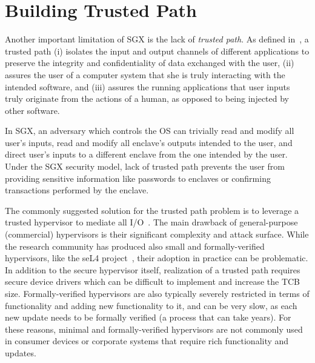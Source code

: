 
\section{Building Trusted Path}
\label{sec:secureInput}


Another important limitation of SGX is the lack of \emph{trusted path}. As defined in~\cite{filyanov2011uni}, a trusted path (i) isolates the input and output channels of different applications to preserve the integrity and confidentiality of data exchanged with the user, (ii) assures the user of a computer system that she is truly interacting with the intended software, and (iii) assures the running applications that user inputs truly originate from the actions of a human, as opposed to being injected by other software.

In SGX, an adversary which controls the OS can trivially read and modify all user's inputs, read and modify all enclave's outputs intended to the user, and direct user's inputs to a different enclave from the one intended by the user. Under the SGX security model, lack of trusted path prevents the user from providing sensitive information like passwords to enclaves or confirming transactions performed by the enclave.


The commonly suggested solution for the trusted path problem is to leverage a trusted hypervisor to mediate all I/O~\cite{sgxio}. The main drawback of general-purpose (commercial) hypervisors is their significant complexity and attack surface. While the research community has produced also small and formally-verified hypervisors, like the seL4 project~\cite{sel4}, their adoption in practice can be problematic. In addition to the secure hypervisor itself, realization of a trusted path requires secure device drivers which can be difficult to implement and increase the TCB size. Formally-verified hypervisors are also typically severely restricted in terms of functionality and adding new functionality to it, and can be very slow, as each new update needs to be formally verified (a process that can take years). For these reasons, minimal and formally-verified hypervisors are not commonly used in consumer devices or corporate systems that require rich functionality and updates.

